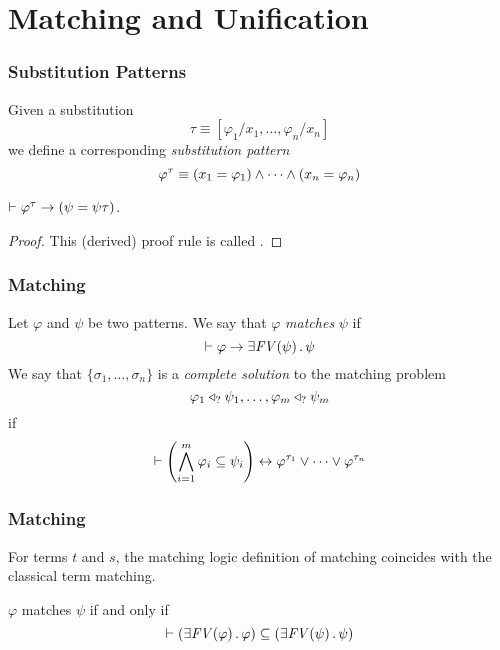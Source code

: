 \documentclass{beamer}
\begin{document}
\section{Matching and Unification}

\begin{frame}

\frametitle{Substitution Patterns}

\begin{definition}
Given a substitution
\[\tau \equiv [\varphi_1 / x_1 , \dots , \varphi_n / x_n] \]
we define a corresponding \emph{substitution pattern}
\[\varphi^\tau \equiv (x_1 = \varphi_1) \land \dots \land (x_n = \varphi_n) \]
\end{definition}

\begin{lemma}
$\vdash \varphi^\tau \rightarrow (\psi = \psi\tau)$.
\end{lemma}
\begin{proof}
This (derived) proof rule is called . 
\end{proof}
\end{frame}

\begin{frame}

\frametitle{Matching}

\begin{definition}
\label{def:matching}
Let $\varphi$ and $\psi$ be two patterns. 
We say that $\varphi$ \emph{matches} $\psi$
if
\[\vdash \varphi \rightarrow \exists \mathit{FV(\psi)} \,.\, \psi \]
We say that $\{\sigma_1,\dots,\sigma_n\}$ is a \emph{complete solution}
to the matching problem
\[\varphi_1 \triangleleft_? \psi_1, \dots, \varphi_m \triangleleft_? \psi_m\] if
\[\vdash \left(\bigwedge_{i=1}^m \varphi_i \subseteq \psi_i \right)
  \leftrightarrow \varphi^{\tau_1} \lor \dots \lor \varphi^{\tau_n}
\]
\end{definition}

\end{frame}

\begin{frame}

\frametitle{Matching}
\begin{lemma}
For terms $t$ and $s$,
the matching logic definition of matching
coincides with the classical term matching.
\end{lemma}

\begin{lemma}
$\varphi$ matches $\psi$ if and only if
\[\vdash \left(\exists \mathit{FV(\varphi)} \,.\, \varphi\right)
  \subseteq \left(\exists \mathit{FV(\psi)} \,.\, \psi\right)
\]
\end{lemma}

\end{frame}
\end{document}
